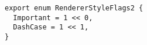 \begin{verbatim}
export enum RendererStyleFlags2 {
  Important = 1 << 0,
  DashCase = 1 << 1,
}
\end{verbatim}
